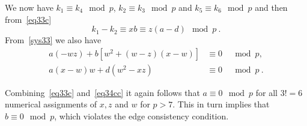  We now have $k_1 \equiv k_4 \mod p$, $k_2
\equiv k_3 \mod p$ and $k_5 \equiv k_6 \mod p$ and then
from~\eqref{eq33c}
\begin{equation}\label{eq34c}
k_1 -k_2 \equiv xb \equiv z(a-d) \mod p~.
\end{equation}
From~\eqref{sys33} we also have
\begin{equation}\label{eq34cc}\begin{array}{cccc}
a(-wz)+b[w^2+(w-z)(x-w)] &\equiv 0&\mod p,\\
a(x-w)w+d(w^2-xz) &\equiv 0&\mod p~.
\end{array}\end{equation}


Combining~\eqref{eq33c} and~\eqref{eq34cc} it again follows that
$a \equiv 0 \mod p$ for all $3!=6$ numerical assignments of $x,z$
and $w$ for $p>7$. This in turn implies that $b \equiv 0 \mod p$,
which violates the edge consistency condition.
